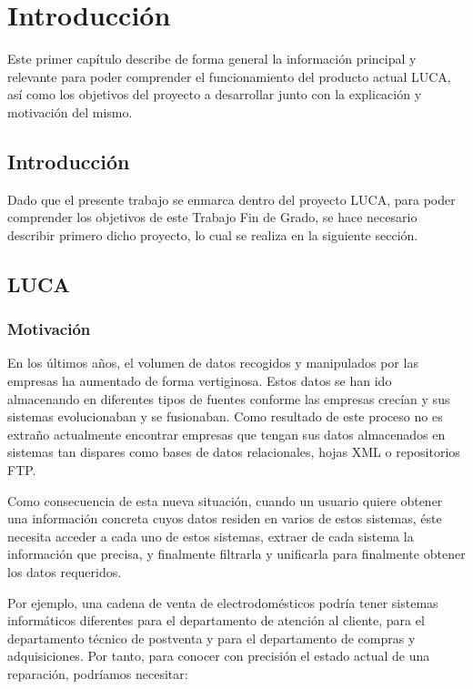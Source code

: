 \chapter{Introducción}
	
Este primer capítulo describe de forma general la información principal y relevante para poder comprender el funcionamiento del producto actual LUCA, así como los objetivos del proyecto a desarrollar junto con la explicación y motivación del mismo.
	
\section{Introducción}


Dado que el presente trabajo se enmarca dentro del proyecto LUCA, para poder comprender los objetivos de este Trabajo Fin de Grado, se hace necesario describir primero dicho proyecto, lo cual se realiza en la siguiente sección.

\section{LUCA}

\subsection{Motivación}

En los últimos años, el volumen de datos recogidos y manipulados por las empresas ha aumentado de forma vertiginosa. Estos datos se han ido almacenando en diferentes tipos de fuentes conforme las empresas crecían y sus sistemas evolucionaban y se fusionaban. Como resultado de  este proceso no es extraño actualmente encontrar empresas que tengan sus datos almacenados en sistemas tan dispares como bases de datos relacionales, hojas XML o repositorios FTP.


Como consecuencia de esta nueva situación, cuando un usuario quiere obtener una información concreta cuyos datos residen en varios de estos sistemas, éste necesita acceder a cada uno de estos sistemas, extraer de cada sistema la información que precisa, y finalmente filtrarla y unificarla para finalmente obtener los datos requeridos.

Por ejemplo, una cadena de venta de electrodomésticos podría tener sistemas informáticos diferentes para el departamento de atención al cliente, para el departamento técnico de postventa y para el departamento de compras y adquisiciones. Por tanto, para conocer con precisión el estado actual de una reparación, podríamos necesitar:

